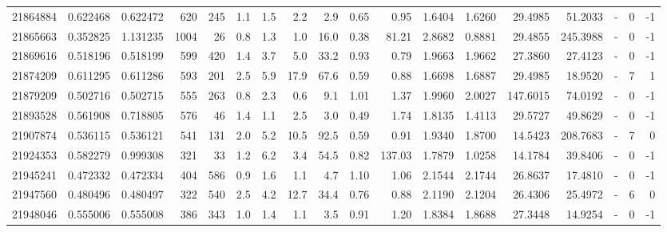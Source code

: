 \begin{tabular}{rrrrrrrrrrrrrrrlrr}
  21864884 & 0.622468 &   0.622472 &  620 &  245 &      1.1 &      1.5 &     2.2 &      2.9 &       0.65 &        0.95 &  1.6404 &  1.6260 &   29.4985 &   51.2033 &             - &        0 &         -1 \\
  21865663 & 0.352825 &   1.131235 & 1004 &   26 &      0.8 &      1.3 &     1.0 &     16.0 &       0.38 &       81.21 &  2.8682 &  0.8881 &   29.4855 &  245.3988 &             - &        0 &         -1 \\
  21869616 & 0.518196 &   0.518199 &  599 &  420 &      1.4 &      3.7 &     5.0 &     33.2 &       0.93 &        0.79 &  1.9663 &  1.9662 &   27.3860 &   27.4123 &             - &        0 &         -1 \\
  21874209 & 0.611295 &   0.611286 &  593 &  201 &      2.5 &      5.9 &    17.9 &     67.6 &       0.59 &        0.88 &  1.6698 &  1.6887 &   29.4985 &   18.9520 &             - &        7 &          1 \\
  21879209 & 0.502716 &   0.502715 &  555 &  263 &      0.8 &      2.3 &     0.6 &      9.1 &       1.01 &        1.37 &  1.9960 &  2.0027 &  147.6015 &   74.0192 &             - &        0 &         -1 \\
  21893528 & 0.561908 &   0.718805 &  576 &   46 &      1.4 &      1.1 &     2.5 &      3.0 &       0.49 &        1.74 &  1.8135 &  1.4113 &   29.5727 &   49.8629 &             - &        0 &         -1 \\
  21907874 & 0.536115 &   0.536121 &  541 &  131 &      2.0 &      5.2 &    10.5 &     92.5 &       0.59 &        0.91 &  1.9340 &  1.8700 &   14.5423 &  208.7683 &             - &        7 &          0 \\
  21924353 & 0.582279 &   0.999308 &  321 &   33 &      1.2 &      6.2 &     3.4 &     54.5 &       0.82 &      137.03 &  1.7879 &  1.0258 &   14.1784 &   39.8406 &             - &        0 &         -1 \\
  21945241 & 0.472332 &   0.472334 &  404 &  586 &      0.9 &      1.6 &     1.1 &      4.7 &       1.10 &        1.06 &  2.1544 &  2.1744 &   26.8637 &   17.4810 &             - &        0 &         -1 \\
  21947560 & 0.480496 &   0.480497 &  322 &  540 &      2.5 &      4.2 &    12.7 &     34.4 &       0.76 &        0.88 &  2.1190 &  2.1204 &   26.4306 &   25.4972 &             - &        6 &          0 \\
  21948046 & 0.555006 &   0.555008 &  386 &  343 &      1.0 &      1.4 &     1.1 &      3.5 &       0.91 &        1.20 &  1.8384 &  1.8688 &   27.3448 &   14.9254 &             - &        0 &         -1 \\

\end{tabular}
